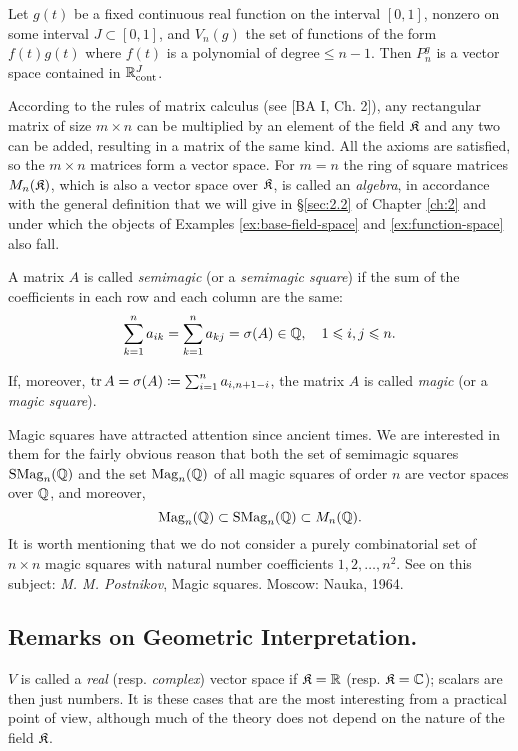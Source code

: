 \begin{example}
	Let $g(t)$ be a fixed continuous real function on the interval $[0,1]$, nonzero on some interval $J\subset [0,1]$, and $V_n (g)$ the set of functions of the form $f(t)g(t)$ where $f(t)$ is a polynomial of degree$\le n-1$. Then $P_n^g$ is a vector space contained in ${\mathbb{R}}_{\mathrm{cont}}^J$.
\end{example}

\begin{example}
	According to the rules of matrix calculus (see [BA I, Ch. 2]), any rectangular matrix of size $m\times n$ can be multiplied by an element of the field ${\mathfrak{K}}$ and any two can be added, resulting in a matrix of the same kind. All the axioms are satisfied, so the $m\times n$ matrices form a vector space. For $m = n$ the ring of square matrices $M_n ({\mathfrak{K}})$, which is also a vector space over ${\mathfrak{K}}$, is called an \textit{algebra}, in accordance with the general definition that we will give in \S\ref{sec:2.2} of Chapter \ref{ch:2} and under which the objects of Examples \ref{ex:base-field-space} and \ref{ex:function-space} also fall.
\end{example}

\begin{example}
	A matrix $A$ is called \textit{semimagic} (or a \textit{semimagic square}) if the sum of the coefficients in each row and each column are the same:
	\[\sum_{k=1}^n a_{ik} = \sum_{k=1}^na_{kj} = \sigma (A)\in {\mathbb{Q}},\quad 1\leqslant i,j \leqslant n.\]
	
	If, moreover, $\operatorname{tr} A=\sigma (A)\coloneqq \sum_{i=1}^n a_{i,n+1-i}$, the matrix $A$ is called \textit{magic} (or a \textit{magic square}).

	Magic squares have attracted attention since ancient times. We are interested in them for the fairly obvious reason that both the set of semimagic squares $\mathrm{SMag}_n ({\mathbb{Q}})$ and the set $\mathrm{Mag}_n ({\mathbb{Q}})$ of all magic squares of order $n$ are vector spaces over ${\mathbb{Q}}$, and moreover, 
	\[\mathrm{Mag}_n({\mathbb{Q}}) \subset \mathrm{SMag}_n({\mathbb{Q}}) \subset M_n({\mathbb{Q}}).\]
	It is worth mentioning that we do not consider a purely combinatorial set of $n\times n$ magic squares with natural number coefficients $1, 2, \dots , n^2$. See on this subject: \textit{M. M. Postnikov}, Magic squares. Moscow: Nauka, 1964.
\end{example}
\subsection{Remarks on Geometric Interpretation.}
$V$ is called a \textit{real} (resp. \textit{complex}) vector space if ${\mathfrak{K}} ={\mathbb{R}}$ (resp. ${\mathfrak{K}} ={\mathbb{C}}$); scalars are then just numbers. It is these cases that are the most interesting from a practical point of view, although much of the theory does not depend on the nature of the field ${\mathfrak{K}}$.

